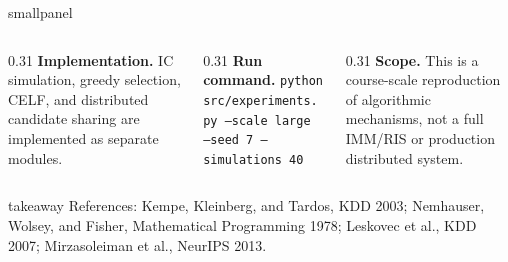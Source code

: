 \documentclass[final]{beamer}
\begin{document}
\begin{frame}[t]
\vspace{0.50cm}
\begin{beamercolorbox}[wd=\textwidth,sep=0.34cm,rounded=true]{smallpanel}
  \begin{columns}[T,totalwidth=\textwidth]
    \begin{column}{0.31\textwidth}
      \textbf{Implementation.}
      IC simulation, greedy selection, CELF, and distributed candidate sharing are implemented as separate modules.
    \end{column}
    \begin{column}{0.31\textwidth}
      \textbf{Run command.}
      \texttt{python src/experiments.py --scale large --seed 7 --simulations 40}
    \end{column}
    \begin{column}{0.31\textwidth}
      \textbf{Scope.}
      This is a course-scale reproduction of algorithmic mechanisms, not a full IMM/RIS or production distributed system.
    \end{column}
  \end{columns}
\end{beamercolorbox}

\vspace{0.28cm}
\begin{beamercolorbox}[wd=\textwidth,sep=0.20cm,rounded=true]{takeaway}
  \centering
  {\scriptsize References: Kempe, Kleinberg, and Tardos, KDD 2003; Nemhauser, Wolsey, and Fisher, Mathematical Programming 1978; Leskovec et al., KDD 2007; Mirzasoleiman et al., NeurIPS 2013.}
\end{beamercolorbox}

\end{frame}
\end{document}
